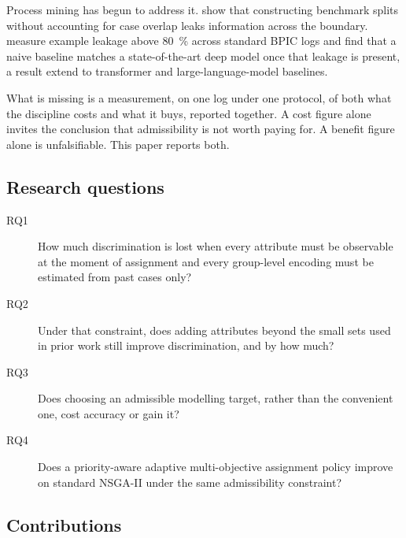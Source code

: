 Process mining has begun to address it. \citet{weytjens2022creating} show that constructing
benchmark splits without accounting for case overlap leaks information across the boundary.
\citet{abb2024discussion} measure example leakage above \SI{80}{\percent} across standard
BPIC logs and find that a naive baseline matches a state-of-the-art deep model once that
leakage is present, a result \citet{weytjens2026david} extend to transformer and
large-language-model baselines.

What is missing is a measurement, on one log under one protocol, of both what the discipline
costs and what it buys, reported together. A cost figure alone invites the conclusion that
admissibility is not worth paying for. A benefit figure alone is unfalsifiable. This paper
reports both.

\subsection{Research questions}

\begin{description}
\item[RQ1] How much discrimination is lost when every attribute must be observable at the
moment of assignment and every group-level encoding must be estimated from past cases only?
\item[RQ2] Under that constraint, does adding attributes beyond the small sets used in prior
work still improve discrimination, and by how much?
\item[RQ3] Does choosing an admissible modelling target, rather than the convenient one,
cost accuracy or gain it?
\item[RQ4] Does a priority-aware adaptive multi-objective assignment policy improve on
standard NSGA-II under the same admissibility constraint?
\end{description}

\subsection{Contributions}

